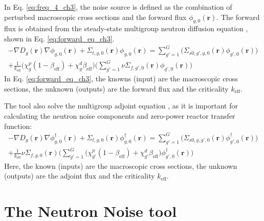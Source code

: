 In Eq. \ref{eq:freq_4_ch3}, the noise source is defined as the combination of perturbed macroscopic cross sections and the forward flux $\phi_{g,0} (\textbf{r})$. The forward flux is obtained from the steady-state multigroup neutron diffusion equation \cite{duderstadtNuclearReactorAnalysis1977}, shown in Eq. \ref{eq:forward_eq_ch3}.
\begin{equation}
        \begin{aligned}
                - \nabla D_g(\textbf{r}) \nabla \phi_{g,0}(\textbf{r}) + \Sigma_{t,g,0}(\textbf{r}) \phi_{g,0}(\textbf{r}) = \sum_{g' = 1}^{G} \biggl(\Sigma_{s0,g',g,0}(\textbf{r}) \phi_{g',0}(\textbf{r}) \biggr) \\
                + \frac{1}{k_{\text{eff}}} \biggl( \chi^p_g (1-\beta_{\text{eff}}) + \chi^d_g \beta_{\text{eff}} \biggr)  \biggl( \sum_{g' = 1}^{G} \nu \Sigma_{f,g',0}(\textbf{r}) \phi_{g',0}(\textbf{r}) \biggr)
        \end{aligned}
        \label{eq:forward_eq_ch3}
\end{equation}
In Eq. \ref{eq:forward_eq_ch3}, the knowns (input) are the macroscopic cross sections, the unknown (outputs) are the forward flux and the criticality $k_{\text{eff}}$. 

The tool also solve the multigroup adjoint equation \cite{duderstadtNuclearReactorAnalysis1977}, as it is important for calculating the neutron noise components and zero-power reactor transfer function:
\begin{equation}
        \begin{aligned}
                - \nabla D_g(\textbf{r}) \nabla \phi^{\dagger}_{g,0}(\textbf{r}) + \Sigma_{t,g,0}(\textbf{r}) \phi^{\dagger}_{g,0}(\textbf{r}) = \sum_{g' = 1}^{G} \biggl(\Sigma_{s0,g,g',0}(\textbf{r}) \phi^{\dagger}_{g',0}(\textbf{r}) \biggr) \\
                + \frac{1}{k_{\text{eff}}} \nu \Sigma_{f,g,0}(\textbf{r}) \biggl( \sum_{g' = 1}^{G} \bigl( \chi^p_{g'} (1-\beta_{\text{eff}}) + \chi^d_{g'} \beta_{\text{eff}} \bigr) \phi^{\dagger}_{g',0}(\textbf{r}) \biggr)
        \end{aligned}
        \label{eq:adjoint_eq_ch3}
\end{equation}
Here, the known (inputs) are the macroscopic cross sections, the unknown (outputs) are the adjoint flux and the criticality $k_{\text{eff}}$.

\section{The Neutron Noise tool}

